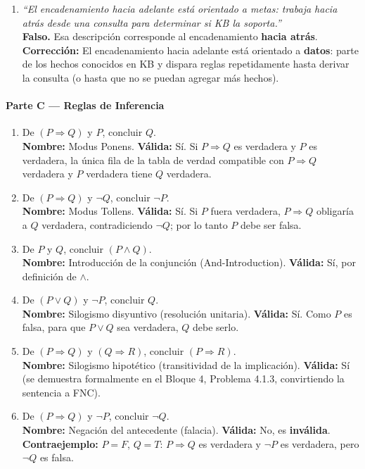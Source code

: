 \begin{enumerate}
    \item \textit{``El encadenamiento hacia adelante está orientado a metas: trabaja hacia atrás
    desde una consulta para determinar si KB la soporta.''}\\
    \textbf{Falso.} Esa descripción corresponde al encadenamiento \textbf{hacia atrás}.\\
    \textbf{Corrección:} El encadenamiento hacia adelante está orientado a \textbf{datos}: parte de
    los hechos conocidos en KB y dispara reglas repetidamente hasta derivar la consulta (o hasta que
    no se puedan agregar más hechos).
\end{enumerate}

\paragraph{Parte C --- Reglas de Inferencia}

\begin{enumerate}
    \item De $(P \Rightarrow Q)$ y $P$, concluir $Q$.\\
    \textbf{Nombre:} Modus Ponens. \quad \textbf{Válida:} Sí. Si $P\Rightarrow Q$ es verdadera y $P$
    es verdadera, la única fila de la tabla de verdad compatible con $P\Rightarrow Q$ verdadera y $P$
    verdadera tiene $Q$ verdadera.

    \item De $(P \Rightarrow Q)$ y $\neg Q$, concluir $\neg P$.\\
    \textbf{Nombre:} Modus Tollens. \quad \textbf{Válida:} Sí. Si $P$ fuera verdadera, $P\Rightarrow
    Q$ obligaría a $Q$ verdadera, contradiciendo $\neg Q$; por lo tanto $P$ debe ser falsa.

    \item De $P$ y $Q$, concluir $(P \land Q)$.\\
    \textbf{Nombre:} Introducción de la conjunción (And-Introduction). \quad \textbf{Válida:} Sí, por
    definición de $\land$.

    \item De $(P \lor Q)$ y $\neg P$, concluir $Q$.\\
    \textbf{Nombre:} Silogismo disyuntivo (resolución unitaria). \quad \textbf{Válida:} Sí. Como $P$
    es falsa, para que $P\lor Q$ sea verdadera, $Q$ debe serlo.

    \item De $(P \Rightarrow Q)$ y $(Q \Rightarrow R)$, concluir $(P \Rightarrow R)$.\\
    \textbf{Nombre:} Silogismo hipotético (transitividad de la implicación). \quad \textbf{Válida:}
    Sí (se demuestra formalmente en el Bloque 4, Problema 4.1.3, convirtiendo la sentencia a FNC).

    \item De $(P \Rightarrow Q)$ y $\neg P$, concluir $\neg Q$.\\
    \textbf{Nombre:} Negación del antecedente (falacia). \quad \textbf{Válida:} No, es \textbf{inválida}.
    \textbf{Contraejemplo:} $P = F$, $Q = T$: $P\Rightarrow Q$ es verdadera y $\neg P$ es verdadera,
    pero $\neg Q$ es falsa.
\end{enumerate}

